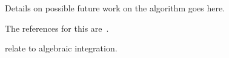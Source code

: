 Details on possible future work on the algorithm goes here.

The references for this
are~\cite{adamchik1990hypergeometric,roach1997meijerg,
kauers2008integration,
davenport1984integration,bronstein1989simplification}.

\cite{kauers2008integration,davenport1984integration} relate to
algebraic integration.
